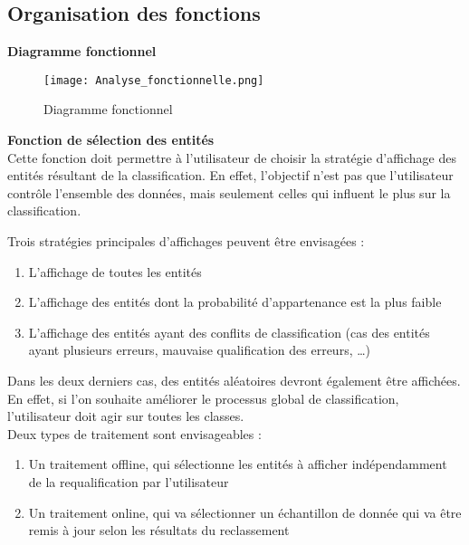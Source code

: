 \subsection{Organisation des fonctions}

\noindent\textbf{Diagramme fonctionnel}\\

\begin{figure}[!h]
	\begin{center}
		\texttt{[image: Analyse\_fonctionnelle.png]}  \\
		\caption[Diagramme fonctionnel]{Diagramme fonctionnel}
		\label{fig:fonction}
	\end{center}
\end{figure}


\noindent\textbf{Fonction de sélection des entités}\\

Cette fonction doit permettre à l’utilisateur de choisir la stratégie d’affichage des entités résultant de la classification. En effet, l’objectif n’est pas que l’utilisateur contrôle l’ensemble des données, mais seulement celles qui influent le plus sur la classification.\newline

Trois stratégies principales d’affichages peuvent être envisagées :
\begin{enumerate}
	\item L’affichage de toutes les entités
	\item L’affichage des entités dont la probabilité d’appartenance est la plus faible
	\item L’affichage des entités ayant des conflits de classification (cas des entités ayant plusieurs erreurs, mauvaise qualification des erreurs, …)\newline
\end{enumerate}

Dans les deux derniers cas, des entités aléatoires devront également être affichées. En effet, si l’on souhaite améliorer le processus global de classification, l’utilisateur doit agir sur toutes les classes.\\ 

Deux types de traitement sont envisageables : 
\begin{enumerate}
	\item Un traitement offline, qui sélectionne les entités à afficher indépendamment de la requalification par l’utilisateur
	\item Un traitement online, qui va sélectionner un échantillon de donnée qui va être remis à jour selon les résultats du reclassement\newline
\end{enumerate}

